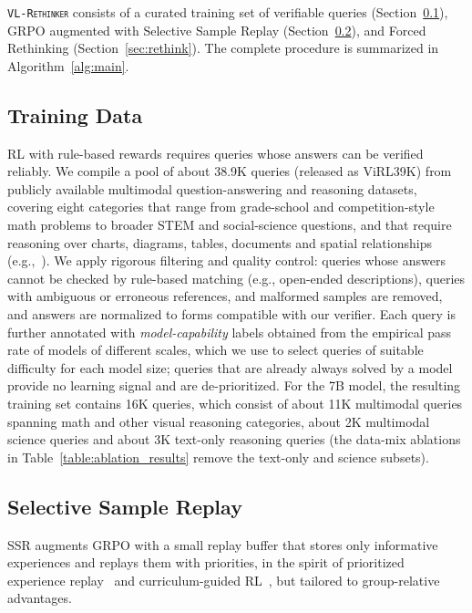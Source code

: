 \documentclass{article}
\newcommand{\model}{\texttt{\textsc{VL-Rethinker}}\xspace}
\begin{document}
\model consists of a curated training set of verifiable queries (Section~\ref{sec:data}), GRPO augmented with Selective Sample Replay (Section~\ref{sec:ssr}), and Forced Rethinking (Section~\ref{sec:rethink}). The complete procedure is summarized in Algorithm~\ref{alg:main}.

\subsection{Training Data}
\label{sec:data}
RL with rule-based rewards requires queries whose answers can be verified reliably. We compile a pool of about 38.9K queries (released as ViRL39K) from publicly available multimodal question-answering and reasoning datasets, covering eight categories that range from grade-school and competition-style math problems to broader STEM and social-science questions, and that require reasoning over charts, diagrams, tables, documents and spatial relationships (e.g.,~\citealp{GeoQA,ai2d,masry2022chartqa,saikh2022scienceqa,lu2021iconqa,figureqa,chang2022mapqa,docvqa,johnson2017clevr}). We apply rigorous filtering and quality control: queries whose answers cannot be checked by rule-based matching (e.g., open-ended descriptions), queries with ambiguous or erroneous references, and malformed samples are removed, and answers are normalized to forms compatible with our verifier. Each query is further annotated with \emph{model-capability} labels obtained from the empirical pass rate of models of different scales, which we use to select queries of suitable difficulty for each model size; queries that are already always solved by a model provide no learning signal and are de-prioritized. For the 7B model, the resulting training set contains 16K queries, which consist of about 11K multimodal queries spanning math and other visual reasoning categories, about 2K multimodal science queries and about 3K text-only reasoning queries (the data-mix ablations in Table~\ref{table:ablation_results} remove the text-only and science subsets).

\subsection{Selective Sample Replay}
\label{sec:ssr}

SSR augments GRPO with a small replay buffer that stores only informative experiences and replays them with priorities, in the spirit of prioritized experience replay~\citep{per} and curriculum-guided RL~\citep{curriculum,wang2025learning}, but tailored to group-relative advantages.
\end{document}
